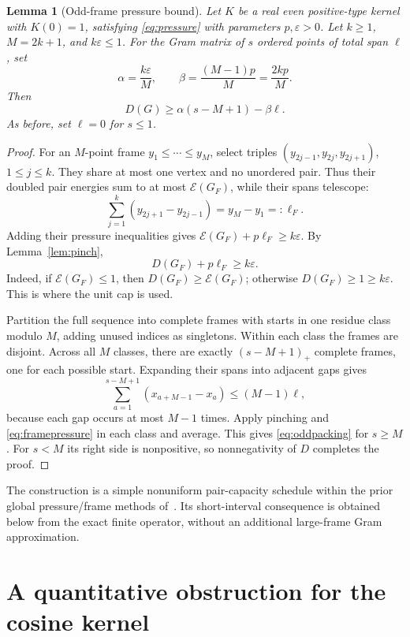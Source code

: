 \documentclass[11pt]{article}
\newtheorem{lemma}[theorem]{Lemma}
\theoremstyle{remark}
\newcommand{\cE}{\mathcal E}
\begin{document}
\begin{lemma}[Odd-frame pressure bound]\label{lem:oddframe}
Let $K$ be a real even positive-type kernel with $K(0)=1$, satisfying
\eqref{eq:pressure} with parameters $p,\varepsilon>0$. Let $k\ge1$,
$M=2k+1$, and $k\varepsilon\le1$. For the Gram matrix of $s$ ordered
points of total span $\ell$, set
\[
 \alpha=\frac{k\varepsilon}{M},\qquad
 \beta=\frac{(M-1)p}{M}=\frac{2kp}{M}.
\]
Then
\begin{equation}\label{eq:oddpacking}
 D(G)\ge\alpha(s-M+1)-\beta\ell.
\end{equation}
As before, set $\ell=0$ for $s\le1$.
\end{lemma}
\begin{proof}
For an $M$-point frame $y_1\le\cdots\le y_M$, select triples
$(y_{2j-1},y_{2j},y_{2j+1})$, $1\le j\le k$. They share at most one
vertex and no unordered pair. Thus their doubled pair energies sum to at
most $\cE(G_F)$, while their spans telescope:
\[
 \sum_{j=1}^k(y_{2j+1}-y_{2j-1})=y_M-y_1=:\ell_F.
\]
Adding their pressure inequalities gives
$\cE(G_F)+p\ell_F\ge k\varepsilon$. By Lemma~\ref{lem:pinch},
\begin{equation}\label{eq:framepressure}
 D(G_F)+p\ell_F\ge k\varepsilon.
\end{equation}
Indeed, if $\cE(G_F)\le1$, then $D(G_F)\ge\cE(G_F)$; otherwise
$D(G_F)\ge1\ge k\varepsilon$. This is where the unit cap is used.

Partition the full sequence into complete frames with starts in one
residue class modulo $M$, adding unused indices as singletons. Within
each class the frames are disjoint. Across all $M$ classes, there are
exactly $(s-M+1)_+$ complete frames, one for each possible start. Expanding
their spans into adjacent gaps gives
\[
 \sum_{a=1}^{s-M+1}(x_{a+M-1}-x_a)\le(M-1)\ell,
\]
because each gap occurs at most $M-1$ times. Apply pinching and
\eqref{eq:framepressure} in each class and average. This gives
\eqref{eq:oddpacking} for $s\ge M$. For $s<M$ its right side is
nonpositive, so nonnegativity of $D$ completes the proof.
\end{proof}

The construction is a simple nonuniform pair-capacity schedule within
the prior global pressure/frame methods of~\cite{Ainta,Trmdy,Tawan,Shi}.
Its short-interval consequence is obtained below from the exact finite
operator, without an additional large-frame Gram approximation.

\section{A quantitative obstruction for the cosine kernel}
\end{document}
